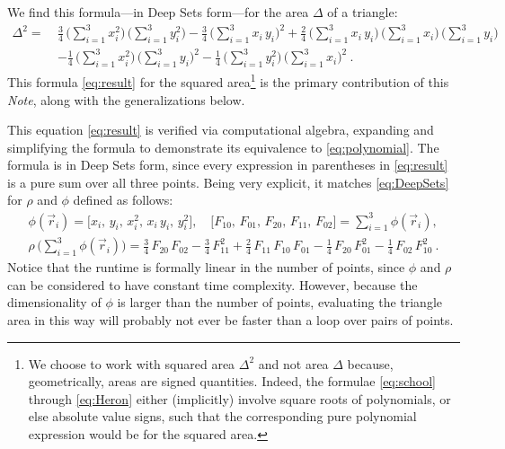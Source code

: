 \documentclass[10pt]{article}
\newcommand{\documentname}{\textsl{Note}}
\newcommand{\secbreak}{\bigskip{\centering\footnotesize%
\rotatebox[origin=c]{55}{$\triangle$}~~~%
\rotatebox[origin=c]{35}{$\triangle$}~~~%
\rotatebox[origin=c]{15}{$\triangle$}\par}\bigskip\noindent}
\begin{document}
\secbreak
We find this formula---in Deep Sets form---for the area $\Delta$ of a triangle:
\begin{align}
    \Delta^2 = \ &
    \frac{3}{4}
        \,\big( \sum_{i=1}^{3} x_i^2 \big)
        \,\big( \sum_{i=1}^{3} y_i^2 \big)
    - \frac{3}{4}
        \,\big( \sum_{i=1}^{3} x_i \, y_i \big)^2 
    + \frac{2}{4}
        \,\big( \sum_{i=1}^{3} x_i \, y_i \big)
        \,\big( \sum_{i=1}^{3} x_i \big)
        \,\big( \sum_{i=1}^{3} y_i \big)
    \nonumber\\ &
    - \frac{1}{4}
        \,\big( \sum_{i=1}^{3} x_i^2 \big)
        \,\big( \sum_{i=1}^{3} y_i \big)^2
    - \frac{1}{4}
        \,\big( \sum_{i=1}^{3} y_i^2 \big)
        \,\big( \sum_{i=1}^{3} x_i \big)^2
     ~.
\label{eq:result}
\end{align}
This formula \eqref{eq:result} for the squared area\footnote{%
    We choose to work with squared area $\Delta^2$ and not area $\Delta$ because, geometrically, areas are signed quantities.
    Indeed, the formulae \eqref{eq:school} through \eqref{eq:Heron} either (implicitly) involve square roots of polynomials, or else absolute value signs, such that the corresponding pure polynomial expression would be for the squared area.}
is the primary contribution of this \documentname, along with the generalizations below.

This equation \eqref{eq:result} is verified via computational algebra, expanding and simplifying the formula to demonstrate its equivalence to \eqref{eq:polynomial}.
The formula is in Deep Sets form, since
every expression in parentheses in \eqref{eq:result} is a pure sum over all three points.
Being very explicit, it matches \eqref{eq:DeepSets} for $\rho$ and $\phi$ defined as follows:
\begin{gather}
    \label{eq:resultDeepSets}
    \phi(\vec{r}_i) = \big[
        x_i, \,
        y_i, \,
        x_i^2, \,
        x_i \, y_i, \,
        y_i^2
    \big], \quad
    \big[
        F_{10}, \,
        F_{01}, \,
        F_{20}, \,
        F_{11}, \,
        F_{02}
    \big] = \sum_{i=1}^{3} \phi(\vec{r}_i),
    \\
    \rho \, \big( \sum_{i=1}^{3} \phi(\vec{r}_i) \big)
    = \frac{3}{4} \, F_{20} \, F_{02}
    - \frac{3}{4} \, F_{11}^2
    + \frac{2}{4} \, F_{11} \, F_{10} \, F_{01}
    - \frac{1}{4} \, F_{20} \, F_{01}^2
    - \frac{1}{4} \, F_{02} \, F_{10}^2~.
    \nonumber
\end{gather}
Notice that the runtime is formally linear in the number of points, since $\phi$ and $\rho$ can be considered to have constant time complexity.
However, because the dimensionality of $\phi$ is larger than the number of points, evaluating the triangle area in this way will probably not ever be faster than a loop over pairs of points.
\end{document}
